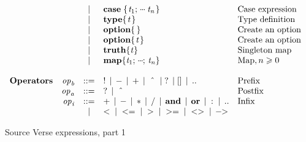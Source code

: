 \begin{figure}
$$\begin{array}{lrcll}
&      & \vb & \ensuremath{\textbf{case}\;\{\mskip1.5mu \Varid{t}_{\mathrm{1}};\,\mydots\;\Varid{t}_{\Varid{n}}\mskip1.5mu\}} & \text{Case expression} \\
&      & \vb & \ensuremath{\textbf{type} \{\mskip1.5mu \Varid{t}\mskip1.5mu\}}         & \text{Type definition} \\
&      & \vb & \ensuremath{\textbf{option} \{\mskip1.5mu \mskip1.5mu\}}        & \text{Create an option} \\
&      & \vb & \ensuremath{\textbf{option} \{\mskip1.5mu \Varid{t}\mskip1.5mu\}}       & \text{Create an option} \\
&      & \vb & \ensuremath{\textbf{truth}\{\Varid{t}\}}       & \text{Singleton map} \\
&      & \vb & \ensuremath{\textbf{map}\{\Varid{t}_{\mathrm{1}};\,\mydots;\,\Varid{t}_{\Varid{n}}\}} & \text{Map}, n \geq 0 \\
\\
\text{\bf Operators} &
 \ensuremath{\Varid{op}_{\Varid{b}}} & ::= &  ! \vb - \vb + \vb \ensuremath{\hat{\hspace{0.8em}}} \vb ? \vb \ensuremath{[]} \vb ..  & \text{Prefix}\\
& \ensuremath{\Varid{op}_{\Varid{a}}} & ::= &  ? \vb \ensuremath{\hat{\hspace{0.8em}}} & \text{Postfix}\\
& \ensuremath{\Varid{op}_{\Varid{i}}} & ::= &  + \vb - \vb * \vb / \vb \ensuremath{\textbf{and}} \vb \ensuremath{\textbf{or}} \vb : \vb .. & \text{Infix} \\
&        & \vb & < \vb <= \vb > \vb >= \vb <> \vb \ensuremath{-\!\!>} \\
\end{array}
$$
\caption{Source Verse expressions, part 1} \label{fig:source-verse-expr}
\end{figure}

